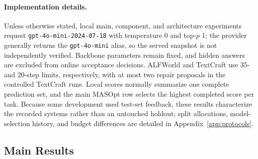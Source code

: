 \paragraph{Implementation details.}
Unless otherwise stated, local main, component, and architecture experiments request \texttt{gpt-4o-mini-2024-07-18} with temperature 0 and top-$p$ 1; the provider generally returns the \texttt{gpt-4o-mini} alias, so the served snapshot is not independently verified. Backbone parameters remain fixed, and hidden answers are excluded from online acceptance decisions. ALFWorld and TextCraft use 35- and 20-step limits, respectively, with at most two repair proposals in the controlled TextCraft runs. Local scores normally summarize one complete prediction set, and the main MASOpt row selects the highest completed score per task. Because some development used test-set feedback, these results characterize the recorded systems rather than an untouched holdout; split allocations, model-selection history, and budget differences are detailed in Appendix~\ref{app:protocols}.

\subsection{Main Results}
\label{sec:main-results}

